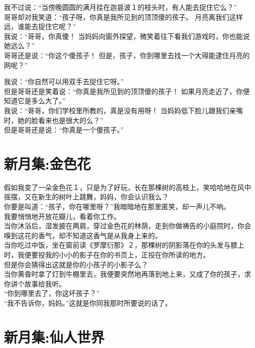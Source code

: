 \documentclass[]{book}
\renewenvironment{quote}{\begin{VF}}{\end{VF}}
\begin{document}
\begin{quote}
我不过说：``当傍晚圆圆的满月挂在迦昙波１的枝头时，有人能去捉住它么？''\\
哥哥却对我笑道：``孩子呀，你真是我所见到的顶顶傻的孩子。
月亮离我们这样远，谁能去捉住它呢？''\\
我说：``哥哥，你真傻！
当妈妈向窗外探望，微笑着往下看我们游戏时，你也能说她远么？''\\
哥哥还是说：``你这个傻孩子！
但是，孩子，你到哪里去找一个大得能逮住月亮的网呢？''

我说：``你自然可以用双手去捉住它呀。''\\
但是哥哥还是笑着说：``你真是我所见到的顶顶傻的孩子！
如果月亮走近了，你便知道它是多么大了。''\\
我说：``哥哥，你们学校里所教的，真是没有用呀！
当妈妈低下脸儿跟我们亲嘴时，她的脸看来也是很大的么？''\\
但是哥哥还是说：``你真是一个傻孩子。''
\end{quote}

\section{新月集:金色花}

\begin{quote}
假如我变了一朵金色花１，只是为了好玩，长在那棵树的高枝上，笑哈哈地在风中摇摆，又在新生的树叶上跳舞，妈妈，你会认识我么？\\
你要是叫道：``孩子，你在哪里呀？''我暗暗地在那里匿笑，却一声儿不响。\\
我要悄悄地开放花瓣儿，看着你工作。\\
当你沐浴后，湿发披在两肩，穿过金色花的林荫，走到你做祷告的小庭院时，你会嗅到这花的香气，却不知道这香气是从我身上来的。\\
当你吃过中饭，坐在窗前读《罗摩衍那》２，那棵树的阴影落在你的头发与膝上时，我便要投我的小小的影子在你的书页上，正投在你所读的地方。\\
但是你会猜得出这就是你的小孩子的小影子么？\\
当你黄昏时拿了灯到牛棚里去，我便要突然地再落到地上来，又成了你的孩子，求你讲个故事给我听。\\
``你到哪里去了，你这坏孩子？''\\
``我不告诉你，妈妈。''这就是你同我那时所要说的话了。
\end{quote}

\section{新月集:仙人世界}
\end{document}
